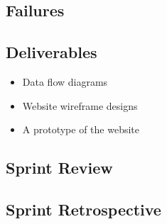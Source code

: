     \subsection{Failures}
    \label{sec:Sprint1_failures}

    \subsection{Deliverables}
    \label{sec:Sprint1_deliverables}
    \begin{itemize}
        \item Data flow diagrams
        \item Website wireframe designs
        \item A prototype of the website
    \end{itemize}

    \subsection{Sprint Review}
    \label{sec:Sprint1_review}

    \subsection{Sprint Retrospective}
    \label{sec:Sprint1_retrospective}
